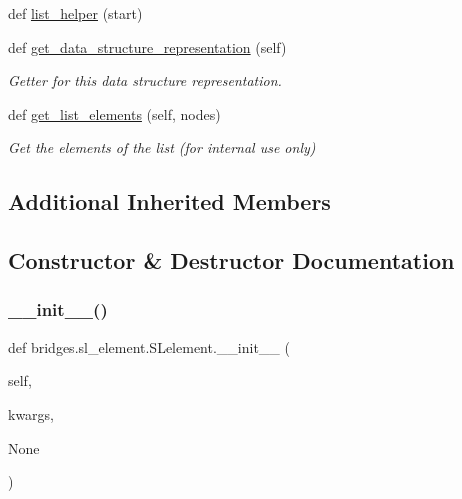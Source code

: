 \begin{DoxyCompactItemize}
def \hyperlink{classbridges_1_1sl__element_1_1_s_lelement_a7aaed085f18082fab6d027ca014130ca}{list\+\_\+helper} (start)
\item 
def \hyperlink{classbridges_1_1sl__element_1_1_s_lelement_af1d3039c3597ce0345d1cd973711714f}{get\+\_\+data\+\_\+structure\+\_\+representation} (self)
\begin{DoxyCompactList}\small\item\em Getter for this data structure representation. \end{DoxyCompactList}\item 
def \hyperlink{classbridges_1_1sl__element_1_1_s_lelement_ad3b94c8e7540aca841e6306c190e1be1}{get\+\_\+list\+\_\+elements} (self, nodes)
\begin{DoxyCompactList}\small\item\em Get the elements of the list (for internal use only) \end{DoxyCompactList}\end{DoxyCompactItemize}
\subsection*{Additional Inherited Members}


\subsection{Constructor \& Destructor Documentation}
\mbox{\label{classbridges_1_1sl__element_1_1_s_lelement_af95c000aa951fbf1c5912892248389d2}} 
\subsubsection{\texorpdfstring{\+\_\+\+\_\+init\+\_\+\+\_\+()}{\_\_init\_\_()}}
{\footnotesize\ttfamily def bridges.\+sl\+\_\+element.\+S\+Lelement.\+\_\+\+\_\+init\+\_\+\+\_\+ (\begin{DoxyParamCaption}\item[{}]{self,  }\item[{}]{kwargs,  }\item[{}]{None }\end{DoxyParamCaption})}




